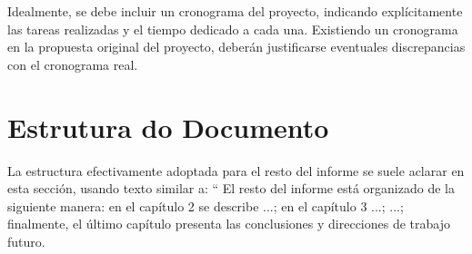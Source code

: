 Idealmente, se debe incluir un cronograma del proyecto, indicando explícitamente las tareas realizadas y el tiempo dedicado a cada una. Existiendo un cronograma en la propuesta original del proyecto, deberán justificarse eventuales discrepancias con el cronograma real.

\section{Estrutura do Documento}

La estructura efectivamente adoptada para el resto del informe se suele aclarar en esta sección, usando texto similar a: `` El resto del informe está organizado de la siguiente manera: en el capítulo 2 se describe ...; en el capítulo 3 ...; ...; finalmente, el último capítulo presenta las conclusiones y direcciones de trabajo futuro.



